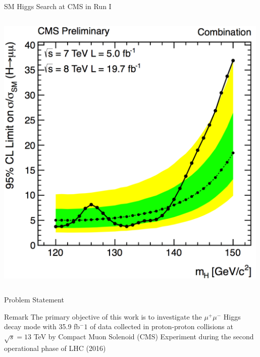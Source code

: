 \documentclass[pdf, 9pt]{beamer}
\begin{document}
\begin{frame}{SM Higgs Search at CMS in Run I}
\begin{columns}[T]
\begin{column}{0.3\textwidth}
        \includegraphics[width=0.99\textwidth, height=0.28\textheight]{figs/higgs/run1/HIGpas_limit_Combination.png}
      \end{column}
    \end{columns}
  \end{frame}

  \begin{frame}{Problem Statement}
    \begin{block}{Remark}
      The primary objective of this work is to investigate the $\mu^{+} \mu^{-}$ Higgs decay mode with 35.9 fb$^-1$ of data collected in proton-proton collisions at $\sqrt{s}=13$ TeV by Compact Muon Solenoid (CMS) Experiment during the second operational phase of LHC (2016)
    \end{block}
  \end{frame}
\end{document}
